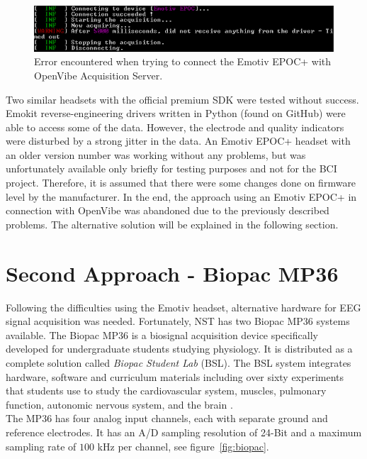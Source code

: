 \documentclass[a4paper,oneside, openright,12pt]{report}
\begin{document}
\begin{figure}[h]
	\centering
	\includegraphics[width=0.8\linewidth]{./gfx/epoc_errorcode}
	\caption{Error encountered when trying to connect the Emotiv EPOC+ with OpenVibe Acquisition Server.}
	\label{fig:epoc_error}
\end{figure}

Two similar headsets with the official premium SDK were tested without success. Emokit reverse-engineering drivers written in Python (found on GitHub) were able to access some of the data. However, the electrode and quality indicators were disturbed by a strong jitter in the data. An Emotiv EPOC+ headset with an older version number was working without any problems, but was unfortunately available only briefly for testing purposes and not for the BCI project. Therefore, it is assumed that there were some changes done on firmware level by the manufacturer. In the end, the approach using an Emotiv EPOC+ in connection with OpenVibe was abandoned due to the previously described problems. The alternative solution will be explained in the following section.

\section{Second Approach - Biopac MP36}
Following the difficulties using the Emotiv headset, alternative hardware for EEG signal acquisition was needed. Fortunately, NST has two Biopac MP36 systems available. The Biopac MP36 is a biosignal acquisition device specifically developed for undergraduate students studying physiology. It is distributed as a complete solution called \textit{Biopac Student Lab} (BSL). The BSL system integrates hardware, software and curriculum materials including over sixty experiments that students use to study the cardiovascular system, muscles, pulmonary function, autonomic nervous system, and the brain \cite{biopac_general}.\\
The MP36 has four analog input channels, each with separate ground and reference electrodes. It has an A/D sampling resolution of 24-Bit and a maximum sampling rate of $100$ kHz per channel, see figure~\ref*{fig:biopac}.
\end{document}
